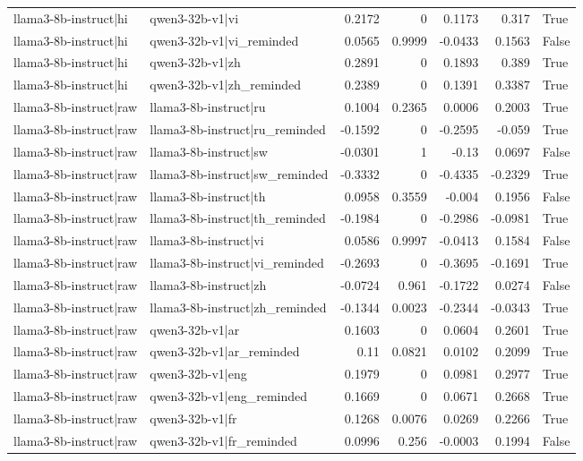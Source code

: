 \begin{table}
\begin{tabular}{l l r r r r l}
llama3-8b-instruct|hi & qwen3-32b-v1|vi & 0.2172 & 0 & 0.1173 & 0.317 & True \\
llama3-8b-instruct|hi & qwen3-32b-v1|vi_reminded & 0.0565 & 0.9999 & -0.0433 & 0.1563 & False \\
llama3-8b-instruct|hi & qwen3-32b-v1|zh & 0.2891 & 0 & 0.1893 & 0.389 & True \\
llama3-8b-instruct|hi & qwen3-32b-v1|zh_reminded & 0.2389 & 0 & 0.1391 & 0.3387 & True \\
llama3-8b-instruct|raw & llama3-8b-instruct|ru & 0.1004 & 0.2365 & 0.0006 & 0.2003 & True \\
llama3-8b-instruct|raw & llama3-8b-instruct|ru_reminded & -0.1592 & 0 & -0.2595 & -0.059 & True \\
llama3-8b-instruct|raw & llama3-8b-instruct|sw & -0.0301 & 1 & -0.13 & 0.0697 & False \\
llama3-8b-instruct|raw & llama3-8b-instruct|sw_reminded & -0.3332 & 0 & -0.4335 & -0.2329 & True \\
llama3-8b-instruct|raw & llama3-8b-instruct|th & 0.0958 & 0.3559 & -0.004 & 0.1956 & False \\
llama3-8b-instruct|raw & llama3-8b-instruct|th_reminded & -0.1984 & 0 & -0.2986 & -0.0981 & True \\
llama3-8b-instruct|raw & llama3-8b-instruct|vi & 0.0586 & 0.9997 & -0.0413 & 0.1584 & False \\
llama3-8b-instruct|raw & llama3-8b-instruct|vi_reminded & -0.2693 & 0 & -0.3695 & -0.1691 & True \\
llama3-8b-instruct|raw & llama3-8b-instruct|zh & -0.0724 & 0.961 & -0.1722 & 0.0274 & False \\
llama3-8b-instruct|raw & llama3-8b-instruct|zh_reminded & -0.1344 & 0.0023 & -0.2344 & -0.0343 & True \\
llama3-8b-instruct|raw & qwen3-32b-v1|ar & 0.1603 & 0 & 0.0604 & 0.2601 & True \\
llama3-8b-instruct|raw & qwen3-32b-v1|ar_reminded & 0.11 & 0.0821 & 0.0102 & 0.2099 & True \\
llama3-8b-instruct|raw & qwen3-32b-v1|eng & 0.1979 & 0 & 0.0981 & 0.2977 & True \\
llama3-8b-instruct|raw & qwen3-32b-v1|eng_reminded & 0.1669 & 0 & 0.0671 & 0.2668 & True \\
llama3-8b-instruct|raw & qwen3-32b-v1|fr & 0.1268 & 0.0076 & 0.0269 & 0.2266 & True \\
llama3-8b-instruct|raw & qwen3-32b-v1|fr_reminded & 0.0996 & 0.256 & -0.0003 & 0.1994 & False \\

\end{tabular}
\end{table}
